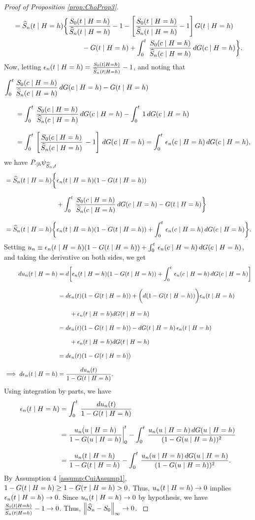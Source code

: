 \begin{proof}[Proof of Proposition \ref{prop:ChoProp3}]
{\begin{align*}
&= \widehat{S}_n(t\mid H = h) \bigg\{ \frac{S_0(t\mid H = h)}{\widehat{S}_n(t\mid H = h)} - 1 -\left[ \frac{S_0(t\mid H = h)}{\widehat{S}_n(t\mid H = h)} - 1 \right] G(t\mid H = h) \\
&\quad \quad \quad \quad \quad \quad \quad  \quad \quad \quad 
- G(t\mid H = h) + \int_0^t\, \frac{S_0(c\mid H = h)}{\widehat{S}_n(c\mid H = h)}\, dG(c\mid H = h) \bigg\}.
\end{align*}
\newcommand{\en}{\epsilon_n}
\newcommand{\un}{u_n}
Now, letting $\en\argtheh =  \fracSoSn - 1$, and noting that
\begin{align*}
\intzerotot &\frac{\truesurv\argcheh}{\Snhat\argcheh}\, dG\argcheh - G\argtheh \eqnspace &=\intzerotot \frac{\truesurv\argcheh}{\Snhat\argcheh}\, dG\argcheh - \intzerotot 1 \, dG\argcheh \eqnspace
&=\intzerotot \left[ \frac{\truesurv\argcheh}{\Snhat\argcheh}\, - 1 \right] \, dG\argcheh =\intzerotot \en\argcheh \, dG\argcheh,
\end{align*} 
we have $P_{\cdot\mid h}\psi_{\widehat{S}_n,t}$
\begin{align*}
 &= \Snhat\argtheh \bigg\{ \en\argtheh (1 - G\argtheh) \eqnspace
&\quad\quad\quad\quad\quad\quad\quad\quad+ \intzerotot \frac{\truesurv\argcheh}{\Snhat\argcheh}\, dG\argcheh - G\argtheh  \bigg\} \eqnspace
&= \Snhat\argtheh \bigg\{ \en\argtheh (1 - G\argtheh) + \intzerotot \en\argcheh\, dG\argcheh  \bigg\}. %
\end{align*}
Setting $\un \equiv \en\argtheh (1 - G\argtheh) + \intzerotot \en\argcheh\, dG\argcheh$, and taking the derivative on both sides, we get %
\begin{equation*}
\begin{aligned}
d\un\argtheh &= d\bigg[ \en\argtheh (1 - G\argtheh) + \intzerotot \en\argcheh\, dG\argcheh \bigg] \eqnspace
&=d\en\argt(1 - G\argtheh) + \bigg(d(1 - G\argtheh)\bigg) \en\argtheh \eqnspace
&\quad \quad + \en\argtheh dG\argtheh \eqnspace
&=d\en\argt(1 - G\argtheh) - dG\argtheh \, \en\argtheh \eqnspace
&\quad \quad + \en\argtheh dG\argtheh \eqnspace
&=d\en\argt(1 - G\argtheh) \eqnspace
\implies d\en\argtheh &= \frac{d\un\argt}{1 - G\argtheh}.
\end{aligned}
\end{equation*}
Using integration by parts, we have
\begin{align*}
\en\argtheh &= \intzerotot \frac{d\un\argt}{1 - G\argtheh} \eqnspace
&= \frac{\un\arguheh}{1-G\arguheh}\bigg|^t_0 - \intzerotot \frac{\un\arguheh \, dG\arguheh}{(1-G\arguheh)^2} \eqnspace
&= \frac{\un\argtheh}{1-G\argtheh} - \intzerotot \frac{\un\arguheh \, dG\arguheh}{(1-G\arguheh)^2}. 
\end{align*}
By Assumption \ifnum{} 4
 \else \ref{assump:CuiAssump1}\fi, $1-G(t\mid H = h) \ge 1- G(\tau\mid H = h) > 0$. Thus, $\un\argtheh \to 0$ implies $\en\argtheh \to 0$. Since $\un\argtheh \to 0$ by hypothesis, we have $\frac{S_0(t\mid H = h)}{\widehat{S}_n(t\mid H = h)} - 1 \to 0$. Thus, $\left\lVert\widehat{S}_n - S_0\right\rVert_\infty \to 0$.
} %

\end{proof}
%
